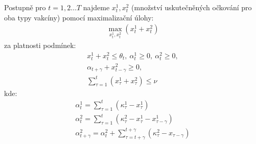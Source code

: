 %
Postupně pro $t=1,2 \dots T$ najdeme $x_{t}^{1},x_{t}^{2}$ (množství uskutečněných očkování pro oba typy vakcíny) pomocí maximalizační úlohy:
\begin{equation}
\begin{aligned}
\max_{x_{t}^{1},x_{t}^{2}}(x_{t}^{1}+x_{t}^{2})
\end{aligned}
\end{equation}
za platnosti podmínek:
\begin{equation}
\begin{aligned}
x_{t}^{1}+x_{t}^{2} \leq \theta_{t}, \: \alpha_{t}^{1} \geq 0, \: \alpha_{t}^{2} \geq 0, \\
\alpha_{t+\gamma} + x_{t-\gamma}^2 \geq 0, \: \\
\sum_{\tau=1}^{t}(x_{\tau}^{1}+x_{\tau}^{2}) \leq \nu
\end{aligned}
\end{equation}
kde:
\begin{equation}
\begin{aligned}
\alpha_{t}^{1}=\sum_{\tau=1}^{t}(\kappa_{\tau}^{1}-x_{\tau}^{1}) \\
\alpha_{t}^{2}=\sum_{\tau=1}^{t}(\kappa_{\tau}^{2}-x_{\tau}^{1}-x_{\tau-\gamma}^{1}) \\
\alpha_{t+\gamma}^{2}=\alpha_{t}^{2} + \sum_{\tau=t+\gamma}^{t+\gamma}(\kappa_{\tau}^{2}-x_{\tau-\gamma})
\end{aligned}
\end{equation}





